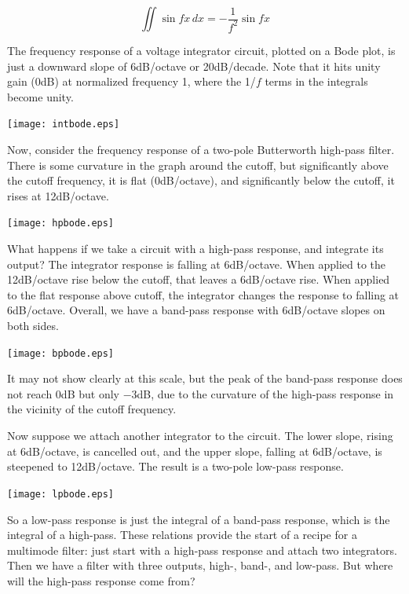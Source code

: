 \begin{equation*}
  \iint \sin f\!x \, dx = - \frac{1}{f^2} \sin f\!x
\end{equation*}

The frequency response of a voltage integrator circuit, plotted on a Bode
plot, is just a downward slope of 6dB/octave or 20dB/decade.  Note that it
hits unity gain (0dB) at normalized frequency 1, where the 1/$f$ terms in
the integrals become unity.

\nopagebreak
{\centering\texttt{[image: intbode.eps]}\par}

Now, consider the frequency response of a two-pole Butterworth high-pass
filter.  There is some curvature in the graph around the cutoff, but
significantly above the cutoff frequency, it is flat (0dB/octave), and
significantly below the cutoff, it rises at 12dB/octave.

\nopagebreak
{\centering\texttt{[image: hpbode.eps]}\par}

What happens if we take a circuit with a high-pass response, and integrate
its output?  The integrator response is falling at 6dB/octave.  When applied
to the 12dB/octave rise below the cutoff, that leaves a 6dB/octave rise. 
When applied to the flat response above cutoff, the integrator changes the
response to falling at 6dB/octave.  Overall, we have a band-pass response
with 6dB/octave slopes on both sides.

\nopagebreak
{\centering\texttt{[image: bpbode.eps]}\par}

It may not show clearly at this scale, but the peak of the band-pass
response does not reach 0dB but only $-$3dB, due to the curvature of the
high-pass response in the vicinity of the cutoff frequency.

Now suppose we attach another integrator to the circuit.  The lower slope,
rising at 6dB/octave, is cancelled out, and the upper slope, falling at
6dB/octave, is steepened to 12dB/octave.  The result is a two-pole low-pass
response.

\nopagebreak
{\centering\texttt{[image: lpbode.eps]}\par}

So a low-pass response is just the integral of a band-pass response, which
is the integral of a high-pass.
These relations provide the start of a recipe for a multimode filter:  just
start with a high-pass response and attach two integrators.  Then we have a
filter with three outputs, high-, band-, and low-pass.  But where will
the high-pass response come from?


